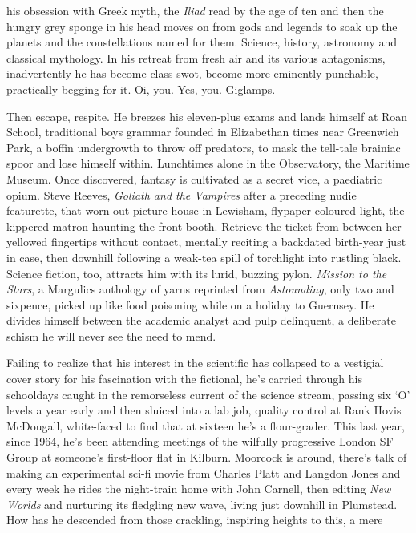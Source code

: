 \documentclass[
]{article}
\begin{document}
his obsession with Greek myth, the \emph{Iliad} read by the age of ten
and then the hungry grey sponge in his head moves on from gods and
legends to soak up the planets and the constellations named for them.
Science, history, astronomy and classical mythology. In his retreat from
fresh air and its various antagonisms, inadvertently he has become class
swot, become more eminently punchable, practically begging for it. Oi,
you. Yes, you. Giglamps. \par
Then escape, respite. He breezes his eleven-plus exams and lands
himself at Roan School, traditional boys grammar founded in Elizabethan
times near Greenwich Park, a boffin undergrowth to throw off predators,
to mask the tell-tale brainiac spoor and lose himself within. Lunchtimes
alone in the Observatory, the Maritime Museum. Once discovered, fantasy
is cultivated as a secret vice, a paediatric opium. Steve Reeves,
\emph{Goliath and the Vampires} after a preceding nudie featurette, that
worn-out picture house in Lewisham, flypaper-coloured light, the
kippered matron haunting the front booth. Retrieve the ticket from
between her yellowed fingertips without contact, mentally reciting a
backdated birth-year just in case, then downhill following a weak-tea
spill of torchlight into rustling black. Science fiction, too, attracts
him with its lurid, buzzing pylon. \emph{Mission to the Stars}, a
Margulics anthology of yarns reprinted from \emph{Astounding}, only two
and sixpence, picked up like food poisoning while on a holiday to
Guernsey. He divides himself between the academic analyst and pulp
delinquent, a deliberate schism he will never see the need to mend. \par
Failing to realize that his interest in the scientific has
collapsed to a vestigial cover story for his fascination with the
fictional, he's carried through his schooldays caught in the remorseless
current of the science stream, passing six `O' levels a year early and
then sluiced into a lab job, quality control at Rank Hovis McDougall,
white-faced to find that at sixteen he's a flour-grader. This last year,
since 1964, he's been attending meetings of the wilfully progressive
London SF Group at someone's first-floor flat in Kilburn. Moorcock is
around, there's talk of making an experimental sci-fi movie from Charles
Platt and Langdon Jones and every week he rides the night-train home
with John Carnell, then editing \emph{New Worlds} and nurturing its
fledgling new wave, living just downhill in Plumstead. How has he
descended from those crackling, inspiring heights to this, a mere
\end{document}
